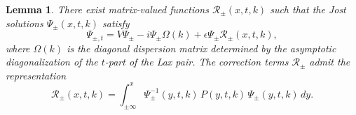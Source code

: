 \documentclass[10pt,a4paper]{amsart}
\newtheorem{lemma}{Lemma}
\begin{document}
\begin{lemma}
\label{lem_5_1}
There exist matrix-valued functions $\mathcal{R}_\pm(x,t,k)$ such that the Jost solutions $\Psi_\pm(x,t,k)$ satisfy
\begin{equation}
\Psi_{\pm,t} = V\Psi_\pm - i\Psi_\pm \Omega(k) + \epsilon \Psi_\pm \mathcal{R}_\pm(x,t,k),
\label{eq:JostTimePerturbed4}
\end{equation}
where $\Omega(k)$ is the diagonal dispersion matrix determined by the asymptotic diagonalization of the $t$-part of the Lax pair. The correction terms $\mathcal{R}_\pm$ admit the representation
\begin{equation}
\mathcal{R}_\pm(x,t,k)=\int_{\pm\infty}^{x}\Psi_\pm^{-1}(y,t,k)\,P(y,t,k)\,\Psi_\pm(y,t,k)\,dy.
\label{eq:Rpm4}
\end{equation}
\end{lemma}
\end{document}
